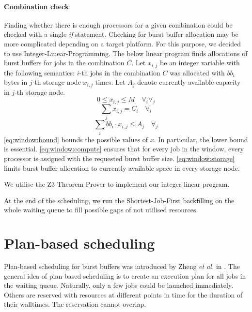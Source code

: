 \documentclass[thesis-en.tex]{subfiles}
\begin{document}
\paragraph{Combination check}
Finding whether there is enough processors for a given combination could be checked with a single \textit{if} statement. Checking for burst buffer allocation may be more complicated depending on a target platform. For this purpose, we decided to use Integer-Linear-Programming. The below linear program finds allocations of burst buffers for jobs in the combination $C$. Let $x_{i,j}$ be an integer variable with the following semantics:  $i$-th jobs in the combination $C$ was allocated with $bb_i$ bytes in $j$-th storage node $x_{i,j}$ times. Let $A_j$ denote currently available capacity in $j$-th storage node.
\begin{equation} \label{eq:window:bound}
    0 \leq x_{i,j} \leq M \quad \forall_i \forall_j
\end{equation}
\begin{equation} \label{eq:window:compute}
    \sum_j x_{i,j} = C_i \quad \forall_i
\end{equation}
\begin{equation} \label{eq:window:storage}
    \sum_i bb_i \cdot x_{i,j} \leq A_j \quad \forall_j
\end{equation}
\autoref{eq:window:bound} bounds the possible values of $x$. In particular, the lower bound is essential. \autoref{eq:window:compute} ensures that for every job in the window, every processor is assigned with the requested burst buffer size. \autoref{eq:window:storage} limits burst buffer allocation to currently available space in every storage node.

We utilise the Z3 Theorem Prover \cite{10.1007/978-3-540-78800-3_24, z3-git} to implement our integer-linear-program.

\medskip

At the end of the scheduling, we run the Shortest-Job-First backfilling on the whole waiting queue to fill possible gaps of not utilised resources.

\section{Plan-based scheduling} \label{sec:plan}
Plan-based scheduling for burst buffers was introduced by Zheng \textit{et al.} in \cite{zheng2016exploring}. The general idea of plan-based scheduling is to create an execution plan for all jobs in the waiting queue. Naturally, only a few jobs could be launched immediately. Others are reserved with resources at different points in time for the duration of their walltimes. The reservation cannot overlap. 
\end{document}
